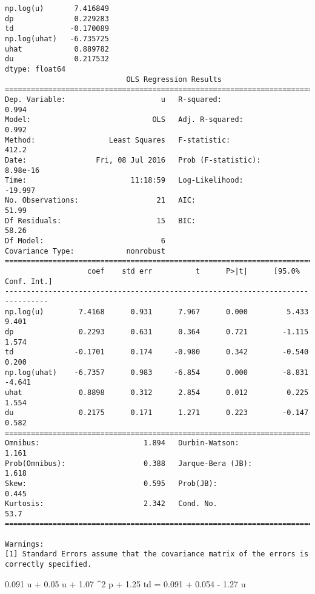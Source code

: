 \documentclass[12pt,fleqn]{article}\usepackage{../../common}
\begin{document}
\begin{verbatim}
np.log(u)       7.416849
dp              0.229283
td             -0.170089
np.log(uhat)   -6.735725
uhat            0.889782
du              0.217532
dtype: float64
                            OLS Regression Results                            
==============================================================================
Dep. Variable:                      u   R-squared:                       0.994
Model:                            OLS   Adj. R-squared:                  0.992
Method:                 Least Squares   F-statistic:                     412.2
Date:                Fri, 08 Jul 2016   Prob (F-statistic):           8.98e-16
Time:                        11:18:59   Log-Likelihood:                -19.997
No. Observations:                  21   AIC:                             51.99
Df Residuals:                      15   BIC:                             58.26
Df Model:                           6                                         
Covariance Type:            nonrobust                                         
================================================================================
                   coef    std err          t      P>|t|      [95.0% Conf. Int.]
--------------------------------------------------------------------------------
np.log(u)        7.4168      0.931      7.967      0.000         5.433     9.401
dp               0.2293      0.631      0.364      0.721        -1.115     1.574
td              -0.1701      0.174     -0.980      0.342        -0.540     0.200
np.log(uhat)    -6.7357      0.983     -6.854      0.000        -8.831    -4.641
uhat             0.8898      0.312      2.854      0.012         0.225     1.554
du               0.2175      0.171      1.271      0.223        -0.147     0.582
==============================================================================
Omnibus:                        1.894   Durbin-Watson:                   1.161
Prob(Omnibus):                  0.388   Jarque-Bera (JB):                1.618
Skew:                           0.595   Prob(JB):                        0.445
Kurtosis:                       2.342   Cond. No.                         53.7
==============================================================================

Warnings:
[1] Standard Errors assume that the covariance matrix of the errors is correctly specified.
\end{verbatim}

0.091 \log u + 0.05 u + 1.07 \Delta^2 p + 1.25 td  =
0.091 \log {} + 0.054  - 1.27 \Delta u
\end{document}
